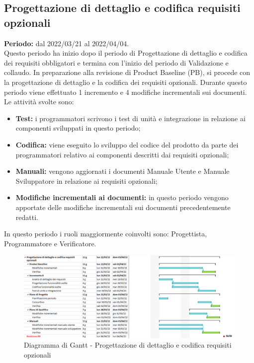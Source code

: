 \subsection{Progettazione di dettaglio e codifica requisiti opzionali} \label{subsection:pianificazione_requisiti_opzionali}
\textbf{Periodo:} dal 2022/03/21 al 2022/04/04.
\bigskip
\\Questo periodo ha inizio dopo il periodo di Progettazione di dettaglio e codifica dei requisiti obbligatori e termina con l'inizio del periodo di Validazione e collaudo.
In preparazione alla revisione di Product Baseline (PB), si procede con la progettazione di dettaglio e la codifica dei requisiti opzionali.
Durante questo periodo viene effettuato 1 incremento e 4 modifiche incrementali sui documenti. 
\\Le attività svolte sono:
\begin{itemize}
  \item \textbf{Test:} i programmatori scrivono i test di unità e integrazione in relazione ai componenti sviluppati in questo periodo;
  \item \textbf{Codifica:} viene eseguito lo sviluppo del codice del prodotto da parte dei programmatori relativo ai componenti descritti dai requisiti opzionali;
  \item \textbf{Manuali:} vengono aggiornati i documenti Manuale Utente e Manuale Sviluppatore in relazione ai requisiti opzionali;
  \item \textbf{Modifiche incrementali ai documenti:} in questo periodo vengono apportate delle modifiche incrementali sui documenti precedentemente redatti.
 \end{itemize}
 In questo periodo i ruoli maggiormente coinvolti sono: Progettista, Programmatore e Verificatore.
 \bigskip
 \begin{figure}[H]
  \centering
   \includegraphics[scale=0.56]{immagini/prog_requisiti_opzionali.png}
   \caption{Diagramma di Gantt - Progettazione di dettaglio e codifica requisiti opzionali}
  \end{figure}
  \pagebreak

